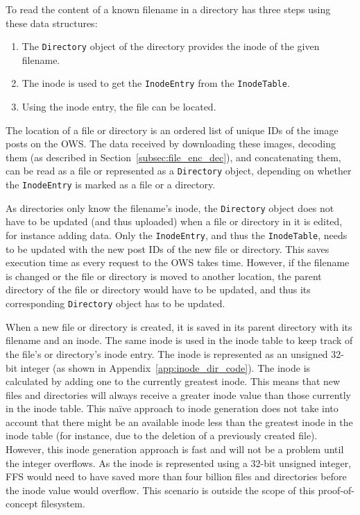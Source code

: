 To read the content of a known filename in a directory has three steps using these data structures:
\begin{enumerate}
	\item The \texttt{Directory} object of the directory provides the inode of the given filename.
	\item The inode is used to get the \texttt{InodeEntry} from the \texttt{InodeTable}.
	\item Using the inode entry, the file can be located.
\end{enumerate}
The location of a file or directory is an ordered list of unique IDs of the image posts on the \gls{OWS}. The data received by downloading these images, decoding them (as described in Section~\ref{subsec:file_enc_dec}), and concatenating them, can be read as a file or represented as a \texttt{Directory} object, depending on whether the \texttt{InodeEntry} is marked as a file or a directory. 

As directories only know the filename's inode, the \texttt{Directory} object does not have to be updated (and thus uploaded) when a file or directory in it is edited, for instance adding data. Only the \texttt{InodeEntry}, and thus the \texttt{InodeTable}, needs to be updated with the new post IDs of the new file or directory. This saves execution time as every request to the \gls{OWS} takes time. However, if the filename is changed or the file or directory is moved to another location, the parent directory of the file or directory would have to be updated, and thus its corresponding \texttt{Directory} object has to be updated.

When a new file or directory is created, it is saved in its parent directory with its filename and an inode. The same inode is used in the inode table to keep track of the file's or directory's inode entry. The inode is represented as an unsigned \mbox{32-bit} integer (as shown in Appendix~\ref{app:inode_dir_code}). The inode is calculated by adding one to the currently greatest inode. This means that new files and directories will always receive a greater inode value than those currently in the inode table. This naïve approach to inode generation does not take into account that there might be an available inode less than the greatest inode in the inode table (for instance, due to the deletion of a previously created file). However, this inode generation approach is fast and will not be a problem until the integer overflows. As the inode is represented using a \mbox{32-bit} unsigned integer, \gls{FFS} would need to have saved more than four billion files and directories before the inode value would overflow. This scenario is outside the scope of this \mbox{proof-of-concept} filesystem.

